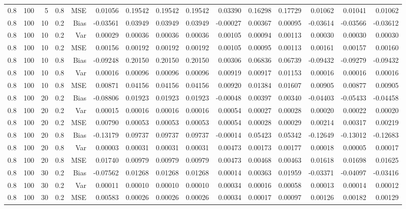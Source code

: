 \begin{table}[!htbp]
\begin{tabular}{lrrrrrrrrrrrrrr}
0.8 & 100 &  5 & 0.8 & MSE & 0.01056 & 0.19542 & 0.19542 & 0.19542 & 0.03390 & 0.16298 & 0.17729 & 0.01062 & 0.01041 & 0.01062 \\
0.8 & 100 & 10 & 0.2 & Bias & -0.03561 & 0.03949 & 0.03949 & 0.03949 & -0.00027 & 0.00367 & 0.00095 & -0.03614 & -0.03566 & -0.03612 \\
0.8 & 100 & 10 & 0.2 & Var & 0.00029 & 0.00036 & 0.00036 & 0.00036 & 0.00105 & 0.00094 & 0.00113 & 0.00030 & 0.00030 & 0.00030 \\
0.8 & 100 & 10 & 0.2 & MSE & 0.00156 & 0.00192 & 0.00192 & 0.00192 & 0.00105 & 0.00095 & 0.00113 & 0.00161 & 0.00157 & 0.00160 \\
0.8 & 100 & 10 & 0.8 & Bias & -0.09248 & 0.20150 & 0.20150 & 0.20150 & 0.00306 & 0.06836 & 0.06739 & -0.09432 & -0.09279 & -0.09432 \\
0.8 & 100 & 10 & 0.8 & Var & 0.00016 & 0.00096 & 0.00096 & 0.00096 & 0.00919 & 0.00917 & 0.01153 & 0.00016 & 0.00016 & 0.00016 \\
0.8 & 100 & 10 & 0.8 & MSE & 0.00871 & 0.04156 & 0.04156 & 0.04156 & 0.00920 & 0.01384 & 0.01607 & 0.00905 & 0.00877 & 0.00905 \\
0.8 & 100 & 20 & 0.2 & Bias & -0.08806 & 0.01923 & 0.01923 & 0.01923 & -0.00048 & 0.00397 & 0.00340 & -0.04403 & -0.05433 & -0.04458 \\
0.8 & 100 & 20 & 0.2 & Var & 0.00015 & 0.00016 & 0.00016 & 0.00016 & 0.00054 & 0.00027 & 0.00028 & 0.00020 & 0.00022 & 0.00020 \\
0.8 & 100 & 20 & 0.2 & MSE & 0.00790 & 0.00053 & 0.00053 & 0.00053 & 0.00054 & 0.00028 & 0.00029 & 0.00214 & 0.00317 & 0.00219 \\
0.8 & 100 & 20 & 0.8 & Bias & -0.13179 & 0.09737 & 0.09737 & 0.09737 & -0.00014 & 0.05423 & 0.05342 & -0.12649 & -0.13012 & -0.12683 \\
0.8 & 100 & 20 & 0.8 & Var & 0.00003 & 0.00031 & 0.00031 & 0.00031 & 0.00473 & 0.00173 & 0.00177 & 0.00018 & 0.00005 & 0.00017 \\
0.8 & 100 & 20 & 0.8 & MSE & 0.01740 & 0.00979 & 0.00979 & 0.00979 & 0.00473 & 0.00468 & 0.00463 & 0.01618 & 0.01698 & 0.01625 \\
0.8 & 100 & 30 & 0.2 & Bias & -0.07562 & 0.01268 & 0.01268 & 0.01268 & 0.00014 & 0.00363 & 0.01959 & -0.03371 & -0.04097 & -0.03416 \\
0.8 & 100 & 30 & 0.2 & Var & 0.00011 & 0.00010 & 0.00010 & 0.00010 & 0.00034 & 0.00016 & 0.00058 & 0.00013 & 0.00014 & 0.00012 \\
0.8 & 100 & 30 & 0.2 & MSE & 0.00583 & 0.00026 & 0.00026 & 0.00026 & 0.00034 & 0.00017 & 0.00097 & 0.00126 & 0.00182 & 0.00129 \\

\end{tabular}
\end{table}
